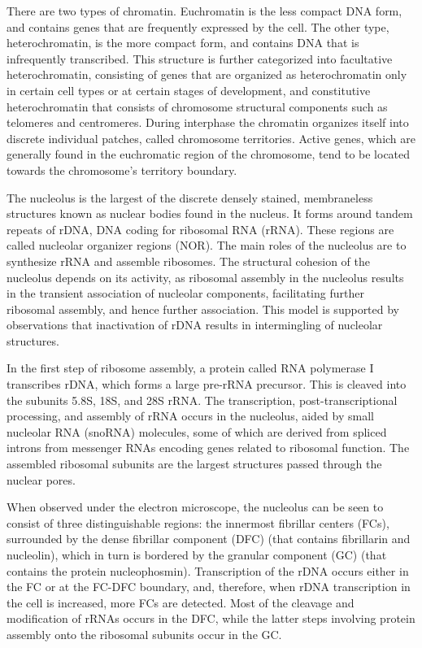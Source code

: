 There are two types of chromatin. Euchromatin is the less compact DNA form, and contains genes that are frequently expressed by the cell. The other type, heterochromatin, is the more compact form, and contains DNA that is infrequently transcribed. This structure is further categorized into facultative heterochromatin, consisting of genes that are organized as heterochromatin only in certain cell types or at certain stages of development, and constitutive heterochromatin that consists of chromosome structural components such as telomeres and centromeres. During interphase the chromatin organizes itself into discrete individual patches, called chromosome territories. Active genes, which are generally found in the euchromatic region of the chromosome, tend to be located towards the chromosome's territory boundary.

The nucleolus is the largest of the discrete densely stained, membraneless structures known as nuclear bodies found in the nucleus. It forms around tandem repeats of rDNA, DNA coding for ribosomal RNA (rRNA). These regions are called nucleolar organizer regions (NOR). The main roles of the nucleolus are to synthesize rRNA and assemble ribosomes. The structural cohesion of the nucleolus depends on its activity, as ribosomal assembly in the nucleolus results in the transient association of nucleolar components, facilitating further ribosomal assembly, and hence further association. This model is supported by observations that inactivation of rDNA results in intermingling of nucleolar structures.

In the first step of ribosome assembly, a protein called RNA polymerase I transcribes rDNA, which forms a large pre-rRNA precursor. This is cleaved into the subunits 5.8S, 18S, and 28S rRNA. The transcription, post-transcriptional processing, and assembly of rRNA occurs in the nucleolus, aided by small nucleolar RNA (snoRNA) molecules, some of which are derived from spliced introns from messenger RNAs encoding genes related to ribosomal function. The assembled ribosomal subunits are the largest structures passed through the nuclear pores.

When observed under the electron microscope, the nucleolus can be seen to consist of three distinguishable regions: the innermost fibrillar centers (FCs), surrounded by the dense fibrillar component (DFC) (that contains fibrillarin and nucleolin), which in turn is bordered by the granular component (GC) (that contains the protein nucleophosmin). Transcription of the rDNA occurs either in the FC or at the FC-DFC boundary, and, therefore, when rDNA transcription in the cell is increased, more FCs are detected. Most of the cleavage and modification of rRNAs occurs in the DFC, while the latter steps involving protein assembly onto the ribosomal subunits occur in the GC.


